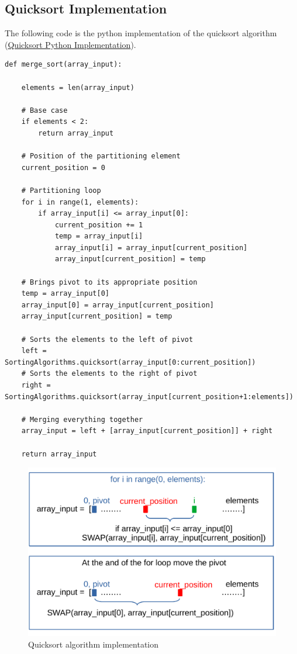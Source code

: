 \subsection{Quicksort Implementation}
The following code is the python implementation of the quicksort algorithm \cite{quicksortcode} (\href{https://www.educative.io/edpresso/how-to-implement-quicksort-in-python}{Quicksort Python Implementation}).
\begin{lstlisting}[firstnumber=1, caption={Quicksort python implementation.}]
def merge_sort(array_input):
	
	elements = len(array_input)
        
    # Base case
    if elements < 2:
    	return array_input
        
    # Position of the partitioning element
    current_position = 0

	# Partitioning loop
	for i in range(1, elements):
    	if array_input[i] <= array_input[0]:
        	current_position += 1
            temp = array_input[i]
            array_input[i] = array_input[current_position]
            array_input[current_position] = temp

    # Brings pivot to its appropriate position
    temp = array_input[0]
    array_input[0] = array_input[current_position]
    array_input[current_position] = temp
        
    # Sorts the elements to the left of pivot
    left = SortingAlgorithms.quicksort(array_input[0:current_position])
    # Sorts the elements to the right of pivot
    right = SortingAlgorithms.quicksort(array_input[current_position+1:elements])

    # Merging everything together
    array_input = left + [array_input[current_position]] + right

	return array_input
\end{lstlisting}

\begin{figure}[H]
	\begin{center}
		\includegraphics[scale=.6]{chapters/searchandsorting/images/sorting_12.pdf}
		\caption[Quicksort algorithm implementation]{Quicksort algorithm implementation}
		\label{sorting_12}
	\end{center}
\end{figure}
